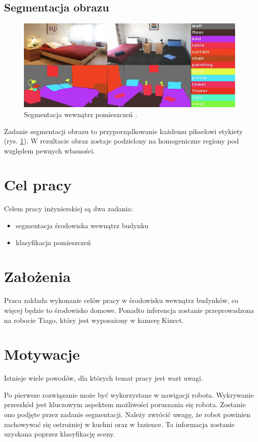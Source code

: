 \subsection{Segmentacja obrazu}
\begin{figure}
    \includegraphics[width=\textwidth]{images/segment.png}
    \caption{Segmentacja wewnątrz pomieszczeń \cite{zhang2018context}.}
    \label{fig:segment}
  \end{figure}

Zadanie segmentacji obrazu to przyporządkowanie każdemu pikselowi etykiety (rys. \ref{fig:segment}). W rezultacie obraz zostaje podzielony na homogeniczne regiony pod względem pewnych własności.

\section{Cel pracy}
Celem pracy inżynierskiej są dwa zadania:
\begin{itemize}
    \item segmentacja środowiska wewnątrz budynku
    \item klasyfikacja pomieszczeń
\end{itemize}
\section{Założenia}
Praca zakłada wykonanie celów pracy w środowisku wewnątrz budynków, co więcej będzie to środowisko domowe. Ponadto inferencja zostanie przeprowadzona na robocie Tiago, który jest wyposażony w kamerę Kinect.
\section{Motywacje}
Istnieje wiele powodów, dla których temat pracy jest wart uwagi.

Po pierwsze rozwiązanie może być wykorzystane w nawigacji robota. Wykrywanie przeszkód jest kluczowym aspektem możliwości poruszania się robota. Zostanie ono podjęte przez zadanie segmentacji. Należy zwrócić uwagę, że robot powinien zachowywać się ostrożniej w kuchni oraz w łazience. Ta informacja zostanie uzyskana poprzez klasyfikację sceny.

